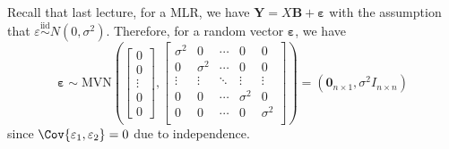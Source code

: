 Recall that last lecture, for a MLR,
we have $ \symbf{Y}=X\symbf{B}+\symbf{\varepsilon} $
with the assumption that $ \varepsilon\stackrel{\text{iid}}{\sim}N(0,\sigma^2) $.
Therefore, for a random vector $ \symbf{\varepsilon} $, we have
\[ \symbf{\varepsilon}\sim\text{MVN}
    \left( \begin{bmatrix}
            0      \\
            0      \\
            \vdots \\
            0      \\
            0
        \end{bmatrix},
    \begin{bmatrix}
            \sigma^2 & 0        & \cdots & 0        & 0        \\
            0        & \sigma^2 & \cdots & 0        & 0        \\
            \vdots   & \vdots   & \ddots & \vdots   & \vdots   \\
            0        & 0        & \cdots & \sigma^2 & 0        \\
            0        & 0        & \cdots & 0        & \sigma^2 \\
        \end{bmatrix} \right)=
    (\symbf{0}_{n\times 1},\sigma^2I_{n\times n}) \]
since $ \Cov{\varepsilon_1,\varepsilon_2}=0 $ due to independence.

